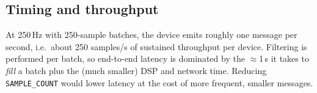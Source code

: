 \subsection{Timing and throughput}
At 250\,Hz with 250-sample batches, the device emits roughly one message per
second, i.e.\ about 250 samples/s of sustained throughput per device. Filtering is
performed per batch, so end-to-end latency is dominated by the $\approx$1\,s it
takes to \emph{fill} a batch plus the (much smaller) DSP and network time. Reducing
\texttt{SAMPLE\_COUNT} would lower latency at the cost of more frequent, smaller
messages.
